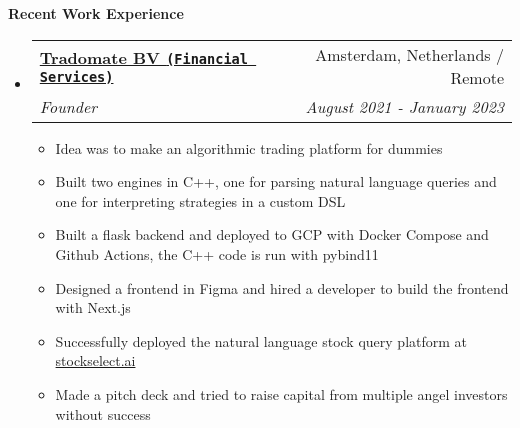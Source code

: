 \documentclass[letterpaper,11pt]{article}
\makeatletter
\newcommand{\resitem}[1]{\item #1 \vspace{-2pt}}
\newcommand{\resheading}[1]{{\large \colorbox{mygrey}{\begin{minipage}{\textwidth}{\textbf{#1 \vphantom{p\^{E}}}}\end{minipage}}}}
\newcommand{\ressubheading}[4]{
\begin{tabular*}{7.0in}{l@{\extracolsep{\fill}}r}
    \textbf{#1} & #2 \\
    \textit{#3} & \textit{#4} \\
\end{tabular*}\vspace{-6pt}}
\makeatother
\begin{document}
\resheading{Recent Work Experience}
\begin{itemize}

\item
    \ressubheading{{\href{https://stockselect.ai}{Tradomate BV \texttt{(Financial Services)}}}}{Amsterdam, Netherlands / Remote}{Founder}{August 2021 - January 2023}
    \begin{itemize}
        \resitem{Idea was to make an algorithmic trading platform for dummies}
        \resitem{Built two engines in C++, one for parsing natural language queries and one for interpreting strategies in a custom DSL}
        \resitem{Built a flask backend and deployed to GCP with Docker Compose and Github Actions, the C++ code is run with pybind11}
        \resitem{Designed a frontend in Figma and hired a developer to build the frontend with Next.js}
        \resitem{Successfully deployed the natural language stock query platform at \href{https://stockselect.ai}{stockselect.ai}}
        \resitem{Made a pitch deck and tried to raise capital from multiple angel investors without success}
    \end{itemize}


\end{itemize}
\end{document}
